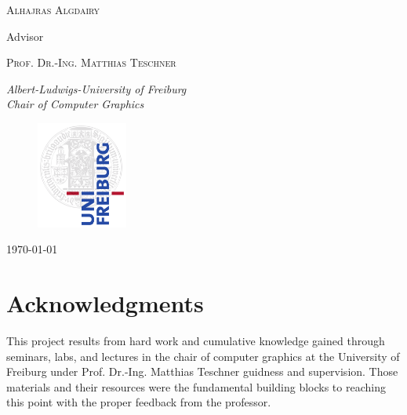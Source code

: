\documentclass[11pt,a4paper]{article}
\begin{document}
\begin{titlepage}
	{\scshape\Large Alhajras Algdairy \\} %
	
			\vspace{0.5\baselineskip} %

		Advisor
	
	\vspace{0.5\baselineskip} %
	
	{\scshape\Large Prof. Dr.-Ing. Matthias Teschner\\} %

	\vspace{0.5\baselineskip} %
		
	\textit{Albert-Ludwigs-University of Freiburg \\ Chair of Computer Graphics} %
	
		
\begin{figure}[h]	
     \centering
         \includegraphics[width=3cm]{images/freiburg.png}
\end{figure}
	\vfill %
	
	


	
	\vspace{0.3\baselineskip} %
	
	\today%
	

\end{titlepage}

\clearpage

\section*{Acknowledgments}
This project results from hard work and cumulative knowledge gained through seminars, labs, and lectures in the chair of computer graphics at the University of Freiburg under Prof. Dr.-Ing. Matthias Teschner guidness and supervision. Those materials and their resources were the fundamental building blocks to reaching this point with the proper feedback from the professor. 
\\
\end{document}
